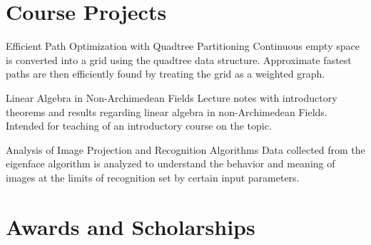 \documentclass[
  9pt, %
]{FreemanCV}
\begin{document}
\begin{paracol}{2}
\begin{tabular}{r l}

\end{tabular}

\medskip

\section{Course Projects}

\paper
  {Efficient Path Optimization with Quadtree Partitioning}
  {Continuous empty space is converted into a grid using the quadtree data structure.
   Approximate fastest paths are then efficiently found by treating the grid as a
   weighted graph.}

\paper
  {Linear Algebra in Non-Archimedean Fields}
  {Lecture notes with introductory theorems and results regarding linear algebra
   in non-Archimedean Fields. Intended for teaching of an introductory course on
   the topic.}

\paper
  {Analysis of Image Projection and Recognition Algorithms}
  {Data collected from the eigenface algorithm is analyzed to understand the
   behavior and meaning of images at the limits of recognition set by certain
   input parameters.}


\section{Awards and Scholarships}




\begin{tabular}{r l} %



\end{tabular}
\end{paracol}
\end{document}
